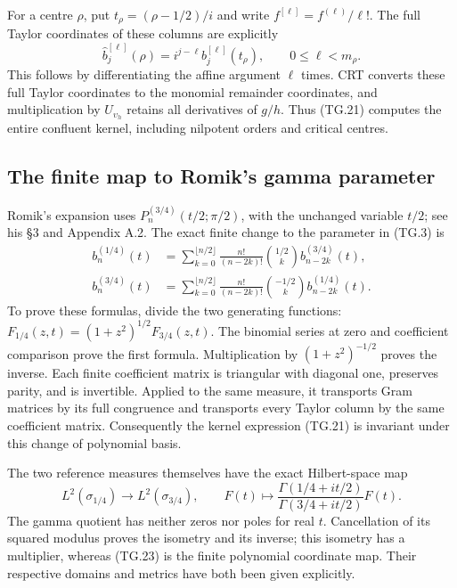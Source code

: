 For a centre \(\rho\), put \(t_\rho=(\rho-1/2)/i\) and
write \(f^{[\ell]}=f^{(\ell)}/\ell!\).  The full Taylor
coordinates of these columns are explicitly
\[
 \widehat b_j^{[\ell]}(\rho)
     =i^{j-\ell}b_j^{[\ell]}(t_\rho),
                 \qquad 0\leq\ell<m_\rho.
                                                               \tag{TG.22}
\]
This follows by differentiating the affine argument \(\ell\)
times.  CRT converts these full Taylor coordinates to the monomial
remainder coordinates, and multiplication by
\(U_{\upsilon_h}\) retains all derivatives of \(g/h\).  Thus
(TG.21) computes the entire confluent kernel, including nilpotent
orders and critical centres.

\subsection{The finite map to Romik's gamma parameter}

Romik's expansion uses \(P_n^{(3/4)}(t/2;\pi/2)\), with the
unchanged variable \(t/2\); see his \S3 and Appendix A.2.
The exact finite change to the parameter in (TG.3) is
\[
 \begin{aligned}
 b_n^{(1/4)}(t)
   &=\sum_{k=0}^{\lfloor n/2\rfloor}
       \frac{n!}{(n-2k)!}\binom{1/2}{k}
                       b_{n-2k}^{(3/4)}(t),\\
 b_n^{(3/4)}(t)
   &=\sum_{k=0}^{\lfloor n/2\rfloor}
       \frac{n!}{(n-2k)!}\binom{-1/2}{k}
                       b_{n-2k}^{(1/4)}(t).
 \end{aligned}                                                    \tag{TG.23}
\]
To prove these formulas, divide the two generating functions:
\(F_{1/4}(z,t)=(1+z^2)^{1/2}F_{3/4}(z,t)\).
The binomial series at zero and coefficient comparison prove the
first formula.  Multiplication by \((1+z^2)^{-1/2}\) proves the
inverse.  Each finite coefficient matrix is triangular with diagonal
one, preserves parity, and is invertible.  Applied to the same
measure, it transports Gram matrices by its full congruence and
transports every Taylor column by the same coefficient matrix.
Consequently the kernel expression (TG.21) is invariant under this
change of polynomial basis.

The two reference measures themselves have the exact Hilbert-space
map
\[
 L^2(\sigma_{1/4})\longrightarrow L^2(\sigma_{3/4}),
 \qquad F(t)\longmapsto
        \frac{\Gamma(1/4+it/2)}{\Gamma(3/4+it/2)}F(t).
                                                               \tag{TG.24}
\]
The gamma quotient has neither zeros nor poles for real \(t\).
Cancellation of its squared modulus proves the isometry and its
inverse; this isometry has a multiplier, whereas (TG.23) is the
finite polynomial coordinate map.  Their respective domains and
metrics have both been given explicitly.

